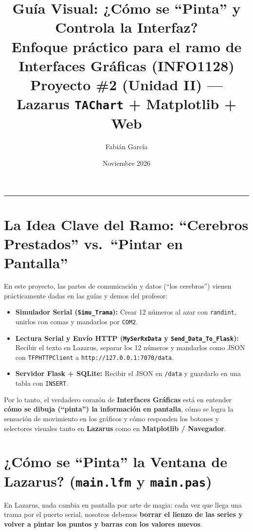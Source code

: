 \documentclass[11pt,a4paper]{article}
\title{\textbf{\textcolor{azuluct}{Guía Visual: ¿Cómo se ``Pinta'' y Controla la Interfaz?}}\\
\Large Enfoque práctico para el ramo de Interfaces Gráficas (INFO1128)\\
\normalsize Proyecto \#2 (Unidad II) --- Lazarus \texttt{TAChart} + Matplotlib + Web}
\author{Fabián García}
\date{Noviembre 2026}
\begin{document}
\maketitle
\tableofcontents
\vspace{1em}
\hrule
\vspace{1em}

\section{La Idea Clave del Ramo: ``Cerebros Prestados'' vs.\ ``Pintar en Pantalla''}

En este proyecto, las partes de comunicación y datos (``los cerebros'') vienen prácticamente dadas en las guías y demos del profesor:
\begin{itemize}[leftmargin=1.5em]
    \item \textbf{Simulador Serial (\texttt{Simu\_Trama}):} Crear 12 números al azar con \texttt{randint}, unirlos con comas y mandarlos por \texttt{COM2}.
    \item \textbf{Lectura Serial y Envío HTTP (\texttt{MySerRxData} y \texttt{Send\_Data\_To\_Flask}):} Recibir el texto en Lazarus, separar los 12 números y mandarlos como JSON con \texttt{TFPHTTPClient} a \texttt{http://127.0.0.1:7070/data}.
    \item \textbf{Servidor Flask + SQLite:} Recibir el JSON en \texttt{/data} y guardarlo en una tabla con \texttt{INSERT}.
\end{itemize}

Por lo tanto, el verdadero corazón de \textbf{Interfaces Gráficas} está en entender \textbf{cómo se dibuja (``pinta'') la información en pantalla}, cómo se logra la sensación de movimiento en los gráficos y cómo responden los botones y selectores visuales tanto en \textbf{Lazarus} como en \textbf{Matplotlib / Navegador}.

\section{¿Cómo se ``Pinta'' la Ventana de Lazarus? (\texttt{main.lfm} y \texttt{main.pas})}

En Lazarus, nada cambia en pantalla por arte de magia: cada vez que llega una trama por el puerto serial, nosotros debemos \textbf{borrar el lienzo de las series y volver a pintar los puntos y barras con los valores nuevos}.
\end{document}

